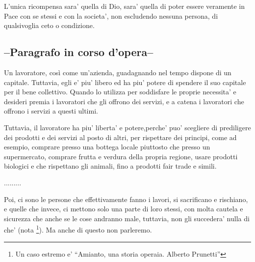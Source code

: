 L'unica ricompensa sara' quella di Dio, sara' quella di poter essere veramente in Pace con se stessi e con la societa', non escludendo nessuna persona, di qualsivoglia ceto o condizione.

\subsection{--Paragrafo in corso d'opera--}

Un lavoratore, così come un'azienda, guadagnando nel tempo dispone di un capitale. Tuttavia, egli e' piu' libero ed ha piu' potere di spendere il suo capitale per il bene collettivo. Quando lo utilizza per soddisfare le proprie necessita' e desideri premia i lavoratori che gli offrono dei servizi, e a catena i lavoratori che offrono i servizi a questi ultimi.

Tuttavia, il lavoratore ha piu' liberta' e potere,perche' puo' scegliere di prediligere dei prodotti e dei servizi al posto di altri, per rispettare dei principi, come ad esempio, comprare presso una bottega locale piuttosto che presso un supermercato, comprare frutta e verdura della propria regione, usare prodotti biologici e che rispettano gli animali, fino a prodotti fair trade e simili.


.........


Poi, ci sono le persone che effettivamente fanno i lavori, si sacrificano e rischiano, e quelle che invece, ci mettono solo una parte di loro stessi, con molta cautela e sicurezza che anche se le cose andranno male, tuttavia, non gli succedera' nulla di che' (nota \footnote{Un caso estremo e' ``Amianto, una storia operaia. Alberto Prunetti''}). Ma anche di questo non parleremo.
